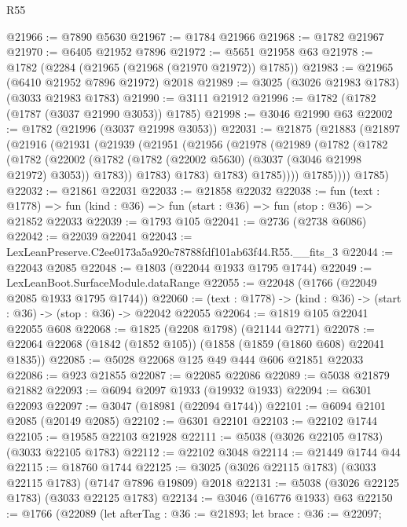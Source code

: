\begin{lexlean}{R55}
\begin{coremodule}
@21966 := @7890 @5630
@21967 := @1784 @21966
@21968 := @1782 @21967
@21970 := @6405 @21952 @7896
@21972 := @5651 @21958 @63
@21978 := @1782 (@2284 (@21965 (@21968 (@21970 @21972)) @1785))
@21983 := @21965 (@6410 @21952 @7896 @21972) @2018
@21989 := @3025 (@3026 @21983 @1783) (@3033 @21983 @1783)
@21990 := @3111 @21912
@21996 := @1782 (@1782 (@1787 (@3037 @21990 @3053)) @1785)
@21998 := @3046 @21990 @63
@22002 := @1782 (@21996 (@3037 @21998 @3053))
@22031 := @21875
    (@21883
      (@21897
        (@21916
          (@21931
            (@21939
              (@21951
                (@21956
                  (@21978
                    (@21989
                      (@1782
                        (@1782
                          (@1782
                            (@22002
                              (@1782
                                (@1782 (@22002 @5630) (@3037 (@3046 @21998 @21972) @3053))
                                @1783))
                            @1783)
                          @1783)
                        @1783)
                      @1785))))
              @1785))))
      @1785)
@22032 := @21861 @22031
@22033 := @21858 @22032
@22038 := fun (text : @1778) =>
  fun (kind : @36) => fun (start : @36) => fun (stop : @36) => @21852 @22033
@22039 := @1793 @105
@22041 := @2736 (@2738 @6086)
@22042 := @22039 @22041
@22043 := LexLeanPreserve.C2ee0173a5a920c78788fdf101ab63f44.R55.__fits_3
@22044 := @22043 @2085
@22048 := @1803 (@22044 @1933 @1795 @1744)
@22049 := LexLeanBoot.SurfaceModule.dataRange
@22055 := @22048 (@1766 (@22049 @2085 @1933 @1795 @1744))
@22060 := (text : @1778) -> (kind : @36) -> (start : @36) -> (stop : @36) -> @22042 @22055
@22064 := @1819 @105 @22041 @22055 @608
@22068 := @1825 (@2208 @1798) (@21144 @2771)
@22078 := @22064 @22068 (@1842 (@1852 @105)) (@1858 (@1859 (@1860 @608) @22041 @1835))
@22085 := @5028 @22068 @125 @49 @444 @606 @21851 @22033
@22086 := @923 @21855
@22087 := @22085 @22086
@22089 := @5038 @21879 @21882
@22093 := @6094 @2097 @1933 (@19932 @1933)
@22094 := @6301 @22093
@22097 := @3047 (@18981 (@22094 @1744))
@22101 := @6094 @2101 @2085 (@20149 @2085)
@22102 := @6301 @22101
@22103 := @22102 @1744
@22105 := @19585 @22103 @21928
@22111 := @5038 (@3026 @22105 @1783) (@3033 @22105 @1783)
@22112 := @22102 @3048
@22114 := @21449 @1744 @44
@22115 := @18760 @1744
@22125 := @3025 (@3026 @22115 @1783) (@3033 @22115 @1783) (@7147 @7896 @19809) @2018
@22131 := @5038 (@3026 @22125 @1783) (@3033 @22125 @1783)
@22134 := @3046 (@16776 @1933) @63
@22150 := @1766
    (@22089
      (let afterTag : @36 := @21893;
      let brace : @36 := @22097;

\end{coremodule}
\end{lexlean}
